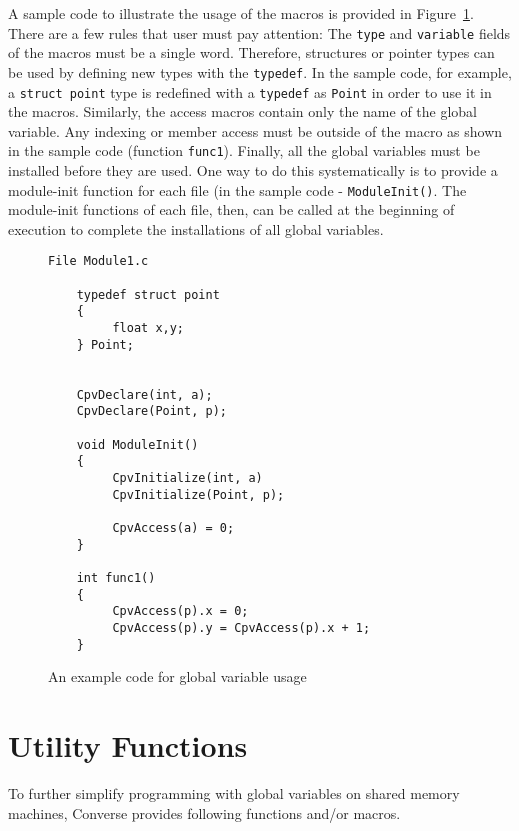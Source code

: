     A sample code to illustrate the usage of the macros is provided
    in Figure~\ref{fig:cpv}.
    There are a few rules that user must pay attention: The
    {\tt type} and {\tt variable} fields of the macros must be a single
    word. Therefore, structures or pointer types can be used by defining
    new types with the {\tt typedef}. In the sample code, for example,
    a {\tt struct point} type is redefined with a {\tt typedef} as {\tt Point}
    in order to use it in the macros. Similarly,  the access macros contain
    only the name of the global variable. Any indexing or member access
    must be outside of the macro as shown in the sample code 
    (function {\tt func1}). Finally, all the global variables must be
    installed before they are used. One way to do this systematically is
    to provide a module-init function for each file (in the sample code - 
    {\tt ModuleInit()}. The module-init functions of each file, then, can be 
    called at the beginning of execution to complete the installations of 
    all global variables.
    
\begin{figure}
\begin{verbatim}
File Module1.c

    typedef struct point
    {
         float x,y;
    } Point;


    CpvDeclare(int, a);
    CpvDeclare(Point, p);

    void ModuleInit()
    {
         CpvInitialize(int, a)
         CpvInitialize(Point, p);

         CpvAccess(a) = 0;
    }

    int func1() 
    {
         CpvAccess(p).x = 0;
         CpvAccess(p).y = CpvAccess(p).x + 1;
    }
\end{verbatim}
\caption{An example code for global variable usage}
\label{fig:cpv}
\end{figure}

\section{Utility Functions}
\label{utility}

To further simplify programming with global variables on shared memory machines,
Converse provides following functions and/or macros. 



